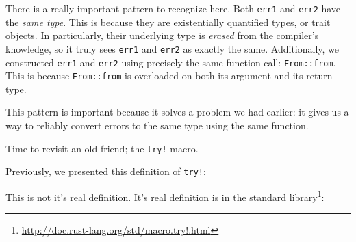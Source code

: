 \documentclass[a4paper,]{book}
\newenvironment{Shaded}{\begin{snugshade}}{\end{snugshade}}
\newcommand{\KeywordTok}[1]{\textcolor[rgb]{0.13,0.29,0.53}{\textbf{{#1}}}}
\newcommand{\ConstantTok}[1]{\textcolor[rgb]{0.00,0.00,0.00}{{#1}}}
\newcommand{\PreprocessorTok}[1]{\textcolor[rgb]{0.56,0.35,0.01}{\textit{{#1}}}}
\newcommand{\NormalTok}[1]{{#1}}
\renewcommand{\href}[2]{#2\footnote{\url{#1}}}
\begin{document}
There is a really important pattern to recognize here. Both
\texttt{err1} and \texttt{err2} have the \emph{same type}. This is
because they are existentially quantified types, or trait objects. In
particularly, their underlying type is \emph{erased} from the compiler's
knowledge, so it truly sees \texttt{err1} and \texttt{err2} as exactly
the same. Additionally, we constructed \texttt{err1} and \texttt{err2}
using precisely the same function call: \texttt{From::from}. This is
because \texttt{From::from} is overloaded on both its argument and its
return type.

This pattern is important because it solves a problem we had earlier: it
gives us a way to reliably convert errors to the same type using the
same function.

Time to revisit an old friend; the \texttt{try!} macro.


Previously, we presented this definition of \texttt{try!}:

\begin{Shaded}
\end{Shaded}

This is not it's real definition. It's real definition is
\href{http://doc.rust-lang.org/std/macro.try!.html}{in the standard
library}:

\begin{Shaded}
\end{Shaded}
\end{document}
